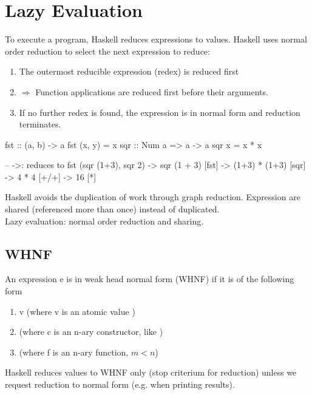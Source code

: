 
\section{Lazy Evaluation}
To execute a program, Haskell reduces expressions to values. Haskell uses normal order reduction to select the next expression to reduce:

\begin{enumerate}
   \item The outermost reducible expression (redex) is reduced first
   \item $\Rightarrow$ Function applications are reduced first before their arguments.
   \item If no further redex is found, the expression is in normal form and reduction terminates.
\end{enumerate}

\begin{Haskell}
fst :: (a, b) -> a
fst (x, y) = x
sqr :: Num a => a -> a
sqr x = x * x

-- ->: reduces to
fst (sqr (1+3), sqr 2) -> sqr (1 + 3) [fst]
                       -> (1+3) * (1+3) [sqr]
                       -> 4 * 4 [+/+]
                       -> 16 [*]
\end{Haskell}

Haskell avoids the duplication of work through graph reduction. Expression are shared (referenced more than once) instead of duplicated.\\
Lazy evaluation: normal order reduction and sharing.

\subsection{WHNF}
An expression e is in weak head normal form (WHNF) if it is of the following form
\begin{enumerate}
   \item v (where v is an atomic value )
   \item {} (where c is an n-ary constructor, like )
   \item {} (where f is an n-ary function, $m<n$)
\end{enumerate}

Haskell reduces values to WHNF only (stop criterium for reduction) unless we request reduction to normal form (e.g. when printing results).\\

